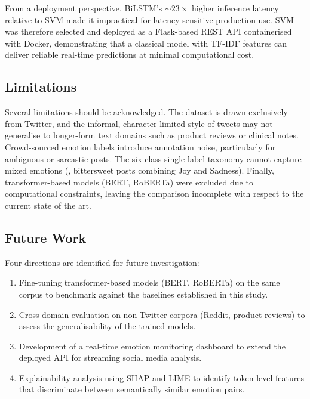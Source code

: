 From a deployment perspective, BiLSTM's ${\sim}23\times$ higher inference latency relative to SVM made it impractical for latency-sensitive production use. SVM was therefore selected and deployed as a Flask-based REST API containerised with Docker, demonstrating that a classical model with TF-IDF features can deliver reliable real-time predictions at minimal computational cost.

\subsection{Limitations}

Several limitations should be acknowledged. The dataset is drawn exclusively from Twitter, and the informal, character-limited style of tweets may not generalise to longer-form text domains such as product reviews or clinical notes. Crowd-sourced emotion labels introduce annotation noise, particularly for ambiguous or sarcastic posts. The six-class single-label taxonomy cannot capture mixed emotions (\eg, bittersweet posts combining Joy and Sadness). Finally, transformer-based models (BERT, RoBERTa) were excluded due to computational constraints, leaving the comparison incomplete with respect to the current state of the art.

\subsection{Future Work}

Four directions are identified for future investigation:
\begin{enumerate}[nosep]
    \item Fine-tuning transformer-based models (BERT, RoBERTa) on the same corpus to benchmark against the baselines established in this study.
    \item Cross-domain evaluation on non-Twitter corpora (Reddit, product reviews) to assess the generalisability of the trained models.
    \item Development of a real-time emotion monitoring dashboard to extend the deployed API for streaming social media analysis.
    \item Explainability analysis using SHAP and LIME to identify token-level features that discriminate between semantically similar emotion pairs.
\end{enumerate}
